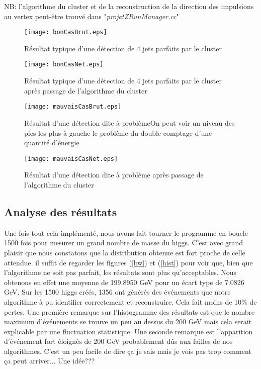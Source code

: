 \documentclass[11pt]{article}
\begin{document}
NB: l'algorithme du cluster et de la reconstruction de la direction des
impulsions au vertex peut-être trouvé dans "\textit{projetZRunManager.cc}"

\begin{figure}
\caption{Résultat typique d'une détection de 4 jets parfaits par le cluster}
\texttt{[image: bonCasBrut.eps]}
\end{figure}
\begin{figure}
\caption{Résultat typique d'une détection de 4 jets parfaits par le cluster
après passage de l'algorithme du cluster}
\texttt{[image: bonCasNet.eps]}
\end{figure}
\begin{figure}
\caption{Résultat d'une détection dite à problème\newline On peut voir un niveau
des pics les plus à gauche le problème du double comptage d'une quantité
d'énergie}
\texttt{[image: mauvaisCasBrut.eps]}
\end{figure}
\begin{figure}
\caption{Résultat  d'une détection dite à problème après passage de l'algorithme
du cluster}
\texttt{[image: mauvaisCasNet.eps]}
\end{figure}

\subsection{Analyse des résultats}

Une fois tout cela implémenté, nous avons fait tourner le programme en boucle
1500 fois pour mesurer un grand nombre de masse du higgs. C'est avec grand
plaisir que nous constatons que la distribution obtenue est fort proche de celle
attendue. il suffit de regarder les figures (\ref{bw}) et (\ref{hist}) pour voir
que, bien que l'algorithme ne soit pas parfait, les résultats sont plus
qu'acceptables. Nous obtenons en effet une moyenne de 199.8950 GeV pour un
écart type de 7.0826 GeV. Sur les 1500 higgs créés, 1356 ont générés des
événements que notre algorithme à pu identifier correctement et reconstruire.
Cela fait moins de 10\% de pertes. Une première remarque sur l'histogramme des
résultats est que le nombre maximum d'événements se trouve un peu au dessus du
200 GeV mais cela serait explicable par une fluctuation statistique. Une seconde
remarque est l'apparition d'événement fort éloignés de 200 GeV probablement dûs
aux failles de nos algorithmes. C'est un peu facile de dire ça je sais mais je
vois pas trop comment ça peut arriver... Une idée???
\end{document}
